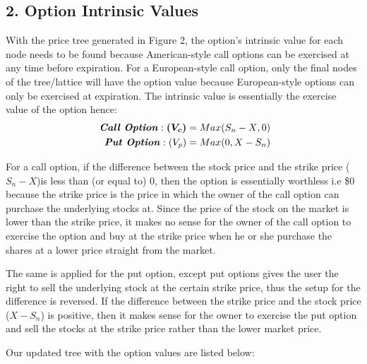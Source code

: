 \documentclass[12pt, letterpaper]{article}
\begin{document}
\subsection*{2. Option Intrinsic Values}

With the price tree generated in Figure 2, the option's intrinsic value for each node needs to be found because American-style call options can be exercised at any time before expiration.
For a European-style call option, only the final nodes of the tree/lattice will have the option value because European-style options can only be exercised at expiration. 
The intrinsic value is essentially the exercise value of the option hence: %
\begin{eqnarray*}
  \textrm{\textit{ \textbf{Call Option}}}: \boldsymbol{(V_c)} = Max({S_n - X}, 0) \\
  \textrm{\textit{ \textbf{Put Option}}}: (V_p) = Max(0, {X - S_n}) 
\end{eqnarray*}

For a call option, if the difference between the stock price and the strike price (${S_n - X}$)is less than (or equal to) 0, then the option is essentially worthless i.e \$0 because the strike price is the price in which the owner of the call option can purchase the underlying stocks at.
Since the price of the stock on the market is lower than the strike price, it makes no sense for the owner of the call option to exercise the option and buy at the strike price when he or she purchase the shares at a lower price straight from the market.

The same is applied for the put option, except put options gives the user the right to sell the underlying stock at the certain strike price, thus the setup for the difference is reversed.
If the difference between the strike price and the stock price (${X - S_n}$) is positive, then it makes sense for the owner to exercise the put option and sell the stocks at the strike price rather than the lower market price.

Our updated tree with the option values are listed below:
\end{document}
